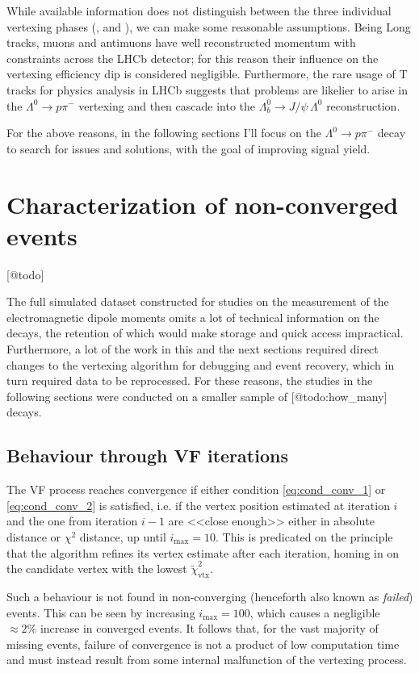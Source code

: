 While available information does not distinguish between the three individual vertexing phases (\jpsi, \lz and \lbz), we can make some reasonable assumptions.
Being Long tracks, muons and antimuons have well reconstructed momentum with constraints across the LHCb detector;
for this reason their influence on the vertexing efficiency dip is considered negligible.
Furthermore, the rare usage of T tracks for physics analysis in LHCb suggests that problems are likelier to arise in the $\Lambda^0 \rightarrow p\pi^-$ vertexing and then cascade into the $\Lambda_b^0 \rightarrow J/\psi\,\Lambda^0$ reconstruction.

For the above reasons, in the following sections I'll focus on the $\Lambda^0 \rightarrow p\pi^-$ decay to search for issues and solutions, with the goal of improving signal yield.


\section{Characterization of non-converged events}
\label{sec:characterization_non_converged}

[@todo]

The full simulated \demonstratorshort dataset constructed for studies on the measurement of the \lz electromagnetic dipole moments omits a lot of technical information on the decays, the retention of which would make storage and quick access impractical.
Furthermore, a lot of the work in this and the next sections required direct changes to the vertexing algorithm for debugging and event recovery, which in turn required data to be reprocessed.
For these reasons, the studies in the following sections were conducted on a smaller sample of [@todo:how\_many] \lbz decays.

\subsection{Behaviour through VF iterations}
\label{sec:oscillation}
The VF process reaches convergence if either condition \eqref{eq:cond_conv_1} or \eqref{eq:cond_conv_2} is satisfied, i.e. if the vertex position estimated at iteration $i$ and the one from iteration $i-1$ are <<close enough>> either in absolute distance or $\chi^2$ distance, up until $i_\text{max} = 10$.
This is predicated on the principle that the algorithm refines its vertex estimate after each iteration, homing in on the candidate vertex with the lowest $\tilde{\chi}^2_\text{vtx}$.

Such a behaviour is not found in non-converging (henceforth also known as \textit{failed}) events.
This can be seen by increasing $i_\text{max}=100$, which causes a negligible $\approx 2\%$ increase in converged events.
It follows that, for the vast majority of missing events, failure of convergence is not a product of low computation time and must instead result from some internal malfunction of the vertexing process.


